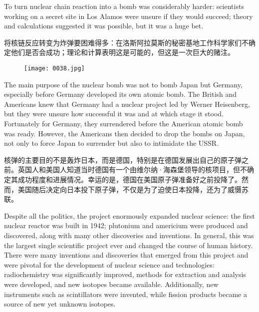 \documentclass[dvipsnames, svgnames,a4paper,11pt]{article}
\begin{document}
To turn nuclear chain reaction into a bomb was considerably harder: scientists working on a secret site in Los Alamos were unsure if they would succeed; theory and calculations suggested it was possible, but it was a huge bet.

将核链反应转变为炸弹要困难得多：在洛斯阿拉莫斯的秘密基地工作科学家们不确定他们是否会成功；理论和计算表明这是可能的，但这是一次巨大的赌注。

\begin{figure}[h]
      \centering
      \texttt{[image: 0038.jpg]}
       \label{fig29}
\end{figure}

The main purpose of the nuclear bomb was not to bomb Japan but Germany, especially before Germany developed its own atomic bomb. The British and Americans knew that Germany had a nuclear project led by Werner Heisenberg, but they were unsure how successful it was and at which stage it stood. Fortunately for Germany, they surrendered before the American atomic bomb was ready. However, the Americans then decided to drop the bombs on Japan, not only to force Japan to surrender but also to intimidate the USSR.

核弹的主要目的不是轰炸日本，而是德国，特别是在德国发展出自己的原子弹之前。英国人和美国人知道当时德国有一个由维尔纳·海森堡领导的核项目，但不确定其成功程度和进展情况。幸运的是，德国在美国原子弹准备好之前投降了。然而，美国随后决定向日本投下原子弹，不仅是为了迫使日本投降，还为了威慑苏联。

Despite all the politics, the project enormously expanded nuclear science: the first nuclear reactor was built in 1942; plutonium and americium were produced and discovered, along with many other discoveries and inventions. In general, this was the largest single scientific project ever and changed the course of human history. There were many inventions and discoveries that emerged from this project and were pivotal for the development of nuclear science and technologies: radiochemistry was significantly improved, methods for extraction and analysis were developed, and new isotopes became available. Additionally, new instruments such as scintillators were invented, while fission products became a source of new yet unknown isotopes.
\end{document}
